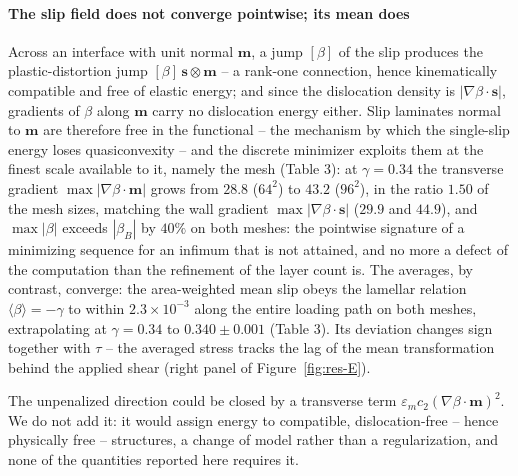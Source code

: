 \documentclass[12pt]{article}
\theoremstyle{plain}
\theoremstyle{definition}
\newcommand{\bs}{\bm{s}}
\newcommand{\bmm}{\bm{m}}
\begin{document}
\paragraph{The slip field does not converge pointwise; its mean does}
Across an interface with unit normal $\bmm$, a jump $[\beta]$ of the slip
produces the plastic-distortion jump $[\beta]\,\bs\otimes\bmm$ -- a rank-one
connection, hence kinematically compatible and free of elastic energy; and
since the dislocation density is $|\nabla\beta\cdot\bs|$, gradients of
$\beta$ along $\bmm$ carry no dislocation energy either. Slip laminates
normal to $\bmm$ are therefore free in the functional -- the mechanism by
which the single-slip energy loses quasiconvexity
\citep{ortiz1999nonconvex,carstensen2002non,conti2005single,conti2005dislocation}
-- and the discrete minimizer exploits them at the finest scale available to it, namely the mesh (Table 3): at $\gamma=0.34$ the transverse gradient $\max|\nabla\beta\cdot\bmm|$ grows from $28.8$ ($64^2$) to $43.2$ ($96^2$), in the ratio $1.50$ of the mesh sizes, matching the wall gradient $\max|\nabla\beta\cdot\bs|$ ($29.9$ and $44.9$), and $\max|\beta|$ exceeds $|\beta_B|$ by $40\%$ on both meshes: the pointwise signature of a minimizing sequence for an infimum that is not
attained, and no more a defect of the computation than the refinement of the
layer count is. The averages, by contrast, converge: the area-weighted mean
slip obeys the lamellar relation $\langle\beta\rangle=-\gamma$ to within
$2.3\times10^{-3}$ along the entire loading path on both meshes, extrapolating at $\gamma=0.34$ to $0.340\pm 0.001$ (Table 3). Its deviation changes sign together with $\tau$ -- the averaged stress tracks the lag of the mean transformation behind the applied shear (right panel of Figure~\ref{fig:res-E}).

The unpenalized direction could be closed by a transverse term
$\varepsilon_m c_2(\nabla\beta\cdot\bmm)^2$. We do not add it: it would
assign energy to compatible, dislocation-free -- hence physically free --
structures, a change of model rather than a regularization, and none of the
quantities reported here requires it.
\end{document}
